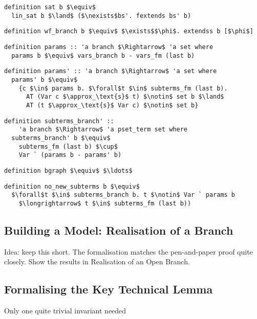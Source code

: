 \documentclass[sigplan,10pt,anonymous,review]{acmart}
\begin{document}
\begin{lstlisting}
definition sat b $\equiv$
  lin_sat b $\land$ ($\nexists$bs'. fextends bs' b)
\end{lstlisting}

\begin{lstlisting}
definition wf_branch b $\equiv$ $\exists$$\phi$. extendss b [$\phi$]
\end{lstlisting}

\begin{lstlisting}
definition params :: 'a branch $\Rightarrow$ 'a set where
  params b $\equiv$ vars_branch b - vars_fm (last b)
\end{lstlisting}

\begin{lstlisting}
definition params' :: 'a branch $\Rightarrow$ 'a set where
  params' b $\equiv$
    {c $\in$ params b. $\forall$t $\in$ subterms_fm (last b).
      AT (Var c $\approx_\text{s}$ t) $\notin$ set b $\land$
      AT (t $\approx_\text{s}$ Var c) $\notin$ set b} 
\end{lstlisting}

\begin{lstlisting}
definition subterms_branch' ::
    'a branch $\Rightarrow$ 'a pset_term set where
  subterms_branch' b $\equiv$
    subterms_fm (last b) $\cup$ 
    Var ` (params b - params' b)
\end{lstlisting}

\begin{lstlisting}
definition bgraph $\equiv$ $\ldots$ 
\end{lstlisting}

\begin{lstlisting}
definition no_new_subterms b $\equiv$
  $\forall$t $\in$ subterms_branch b. t $\notin$ Var ` params b
    $\longrightarrow$ t $\in$ subterms_fm (last b))
\end{lstlisting}

\subsection{Building a Model: Realisation of a Branch}
Idea: keep this short. The formalisation matches the pen-and-paper proof quite closely.
Show the results in Realisation of an Open Branch.

\subsection{Formalising the Key Technical Lemma}
Only one quite trivial invariant needed 
\end{document}
